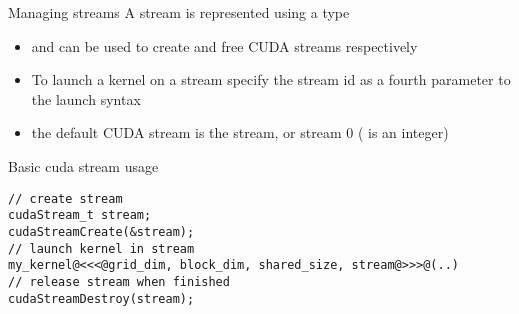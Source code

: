 \begin{frame}[fragile]{}
    \begin{info}{Managing streams}
        A stream is represented using a  type
        \begin{itemize}
            \item {} and  can be used to create and free CUDA streams respectively
            \item To launch a kernel on a stream specify the stream id as a fourth parameter to the launch syntax \\
                \begin{center}  \end{center}
            \item the default CUDA stream is the  stream, or stream 0 ( is an integer)
        \end{itemize}
    \end{info}

    \begin{code}{Basic cuda stream usage}
        \begin{lstlisting}[style=boxcudatiny]
// create stream
cudaStream_t stream;
cudaStreamCreate(&stream);
// launch kernel in stream
my_kernel@<<<@grid_dim, block_dim, shared_size, stream@>>>@(..)
// release stream when finished
cudaStreamDestroy(stream);
        \end{lstlisting}
\end{code}

\end{frame}

